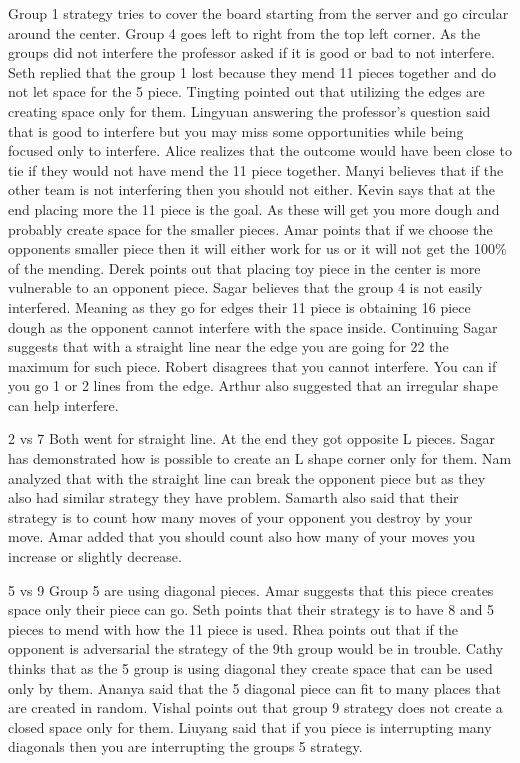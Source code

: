 Group 1 strategy tries to cover the board starting from the server and go circular around the center.
Group 4 goes left to right from the top left corner.
As the groups did not interfere the professor asked if it is good or bad to not interfere.
Seth replied that the group 1 lost because they mend 11 pieces together and do not let space for the 5 piece.
Tingting pointed out that utilizing the edges are creating space only for them.
Lingyuan answering the professor’s question said that is good to interfere but you may miss some opportunities while being focused only to interfere. 
Alice realizes that the outcome would have been close to tie if they would not have mend the 11 piece together.
Manyi believes that if the other team is not interfering then you should not either.
Kevin says that at the end placing more the 11 piece is the goal. As these will get you more dough and probably create space for the smaller pieces.
Amar points that if we choose the opponents smaller piece then it will either 
work for us or it will not get the 100\% of the mending.
Derek points out that placing toy piece in the center is more vulnerable to an opponent piece.
Sagar believes that the group 4 is not easily interfered.  Meaning as they go for edges their 11 piece is obtaining 16 piece dough as the opponent cannot interfere with the space inside.
Continuing Sagar suggests that with a straight line near the edge you are going for 22 the maximum for such piece.
Robert disagrees that you cannot interfere. You can if you go 1 or 2 lines from the edge.
Arthur also suggested that an irregular shape can help interfere. 


2 vs 7
Both went for straight line. At the end they got opposite L pieces.
Sagar has demonstrated how is possible to create an L shape corner only for them.
Nam analyzed that with the straight line can break the opponent piece but as they also had similar strategy they have problem.
Samarth also said that their strategy is to count how many moves of your opponent you destroy by your move.
Amar added that you should count also how many of your moves you increase or slightly decrease.


5 vs 9
Group 5 are using diagonal pieces.
Amar suggests that this piece creates space only their piece can go.
Seth points that their strategy is to have 8 and 5 pieces to mend with how the 11 piece is used.
Rhea points out that if the opponent is adversarial the strategy of the 9th group would be in trouble.
Cathy thinks that as the 5 group is using diagonal they create space that can be used only by them.
Ananya said that the 5 diagonal piece can fit to many places that are created in random.
Vishal points out that group 9 strategy does not create a closed space only for them.
Liuyang  said that if you piece is interrupting many diagonals then you are interrupting the groups 5 strategy.


